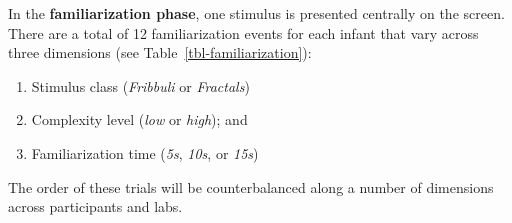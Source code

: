 \documentclass[
  letterpaper,
  DIV=11,
  numbers=noendperiod,
  oneside]{scrreprt}
\providecommand{\tightlist}{%
  \setlength{\itemsep}{0pt}\setlength{\parskip}{0pt}}
\begin{document}
In the \textbf{familiarization phase}, one stimulus is presented
centrally on the screen. There are a total of 12 familiarization events
for each infant that vary across three dimensions (see
Table~\ref{tbl-familiarization}):

\begin{enumerate}
\def\labelenumi{\arabic{enumi}.}
\tightlist
\item
  Stimulus class (\emph{Fribbuli} or \emph{Fractals})
\item
  Complexity level (\emph{low} or \emph{high}); and
\item
  Familiarization time (\emph{5s}, \emph{10s}, or \emph{15s})
\end{enumerate}

The order of these trials will be counterbalanced along a number of
dimensions across participants and labs.
\end{document}
